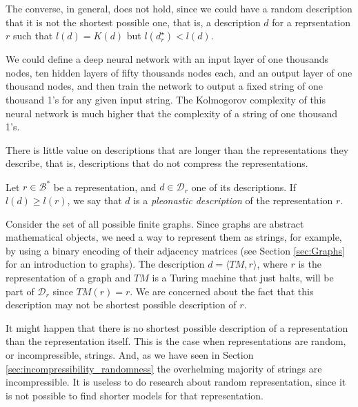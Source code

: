 The converse, in general, does not hold, since we could have a random description that it is not the shortest possible one, that is, a description $d$ for a reprsentation $r$ such that $l(d) = K(d)$ but $l(d_r^{\star}) < l(d)$.

\begin{example}
\label{ex:description_neural}
We could define a deep neural network with an input layer of one thousands nodes, ten hidden layers of fifty thousands nodes each, and an output layer of one thousand nodes, and then train the network to output a fixed string of one thousand 1's for any given input string. The Kolmogorov complexity of this neural network is much higher that the complexity of a string of one thousand 1's.
\end{example}

There is little value on descriptions that are longer than the representations they describe, that is, descriptions that do not compress the representations.

\begin{definition}
\label{def:trivial_model}
Let $r \in \mathcal{B}^\ast$ be a representation, and $d \in \mathcal{D}_r$ one of its descriptions. If $l(d) \geq l(r)$, we say that $d$ is a \emph{pleonastic description} of the representation $r$.
\end{definition}

\begin{example}
\label{ex:topics_models_graph}
Consider the set of all possible finite graphs. Since graphs are abstract mathematical objects, we need a way to represent them as strings, for example, by using a binary encoding of their adjacency matrices (see Section \ref{sec:Graphs} for an introduction to graphs). The description $d = \langle TM, r \rangle$, where $r$ is the representation of a graph and $TM$ is a Turing machine that just halts, will be part of $\mathcal{D}_r$ since $TM(r) = r$. We are concerned about the fact that this description may not be shortest possible description of $r$.
\end{example}

It might happen that there is no shortest possible description of a representation than the representation itself. This is the case when representations are random, or incompressible, strings. And, as we have seen in Section \ref{sec:incompressibility_randomness} the overhelming majority of strings are incompressible. It is useless to do research about random representation, since it is not possible to find shorter models for that representation.

